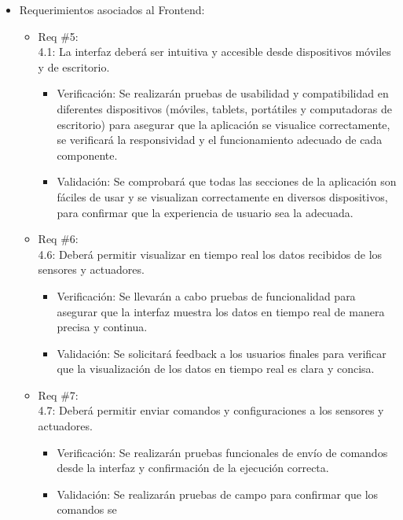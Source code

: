 \begin{itemize}
	\item Requerimientos asociados al Frontend:
	      \begin{itemize}
		      \item Req \#5:\\ 4.1: La interfaz deberá ser intuitiva y accesible desde dispositivos
		            móviles y de escritorio.
		            \begin{itemize}
			            \item Verificación: Se realizarán pruebas de usabilidad y compatibilidad en
			                  diferentes dispositivos (móviles, tablets, portátiles y computadoras de
			                  escritorio) para asegurar que la aplicación se visualice correctamente, se
			                  verificará la responsividad y el funcionamiento adecuado de cada componente.
			            \item Validación: Se comprobará que todas las secciones de la aplicación son fáciles
			                  de usar y se visualizan correctamente en diversos dispositivos, para confirmar
			                  que la experiencia de usuario sea la adecuada.
		            \end{itemize}
		      \item Req \#6: \\ 4.6: Deberá permitir visualizar en tiempo real los datos recibidos
		            de los sensores y actuadores.
		            \begin{itemize}
			            \item Verificación: Se llevarán a cabo pruebas de funcionalidad para asegurar que la
			                  interfaz muestra los datos en tiempo real de manera precisa y continua.
			            \item Validación: Se solicitará feedback a los usuarios finales para verificar que la
			                  visualización de los datos en tiempo real es clara y concisa.
		            \end{itemize}
		      \item Req \#7: \\ 4.7: Deberá permitir enviar comandos y configuraciones a los
		            sensores y actuadores.
		            \begin{itemize}
			            \item Verificación: Se realizarán pruebas funcionales de envío de comandos desde la
			                  interfaz y confirmación de la ejecución correcta.
			            \item Validación: Se realizarán pruebas de campo para confirmar que los comandos se

\end{itemize}
\end{itemize}
\end{itemize}
